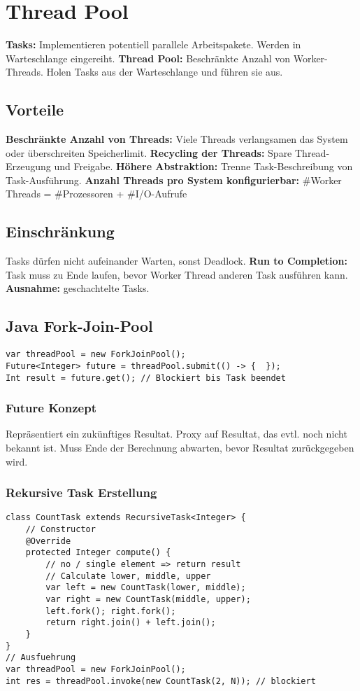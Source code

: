 \section{Thread Pool}
\textbf{Tasks:} Implementieren potentiell parallele Arbeitspakete. Werden in Warteschlange eingereiht.
\textbf{Thread Pool:} Beschränkte Anzahl von Worker-Threads.
Holen Tasks aus der Warteschlange und führen sie aus.

\subsection{Vorteile}
\textbf{Beschränkte Anzahl von Threads:} Viele Threads verlangsamen das System oder überschreiten Speicherlimit. 
\textbf{Recycling der Threads:} Spare Thread-Erzeugung und Freigabe.
\textbf{Höhere Abstraktion:} Trenne Task-Beschreibung von Task-Ausführung.
\textbf{Anzahl Threads pro System konfigurierbar:} \#Worker Threads = \#Prozessoren + \#I/O-Aufrufe 

\subsection{Einschränkung}
Tasks dürfen nicht aufeinander Warten, sonst Deadlock.
\textbf{Run to Completion:} Task muss zu Ende laufen, bevor Worker Thread anderen Task ausführen kann.
\textbf{Ausnahme:} geschachtelte Tasks.

\subsection{Java Fork-Join-Pool}
\begin{lstlisting}
var threadPool = new ForkJoinPool();
Future<Integer> future = threadPool.submit(() -> {  });
Int result = future.get(); // Blockiert bis Task beendet
\end{lstlisting}

\subsubsection{Future Konzept}
Repräsentiert ein zukünftiges Resultat.
Proxy auf Resultat, das evtl. noch nicht bekannt ist. 
Muss Ende der Berechnung abwarten, bevor Resultat zurückgegeben wird.

\subsubsection{Rekursive Task Erstellung}
\begin{lstlisting}
class CountTask extends RecursiveTask<Integer> {
    // Constructor
    @Override
    protected Integer compute() {
        // no / single element => return result
        // Calculate lower, middle, upper
        var left = new CountTask(lower, middle);
        var right = new CountTask(middle, upper);
        left.fork(); right.fork();
        return right.join() + left.join();
    }
}
// Ausfuehrung 
var threadPool = new ForkJoinPool();
int res = threadPool.invoke(new CountTask(2, N)); // blockiert
\end{lstlisting}

